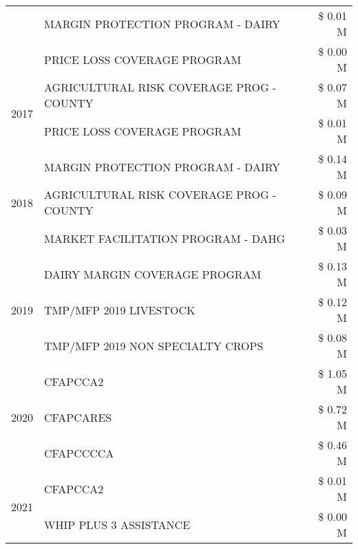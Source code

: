 \begin{tabular}{llr}
 & MARGIN PROTECTION PROGRAM - DAIRY & \$ 0.01 M \\
 & PRICE LOSS COVERAGE PROGRAM & \$ 0.00 M \\
\cline{1-3}
\multirow[t]{2}{*}{2017} & AGRICULTURAL RISK COVERAGE PROG - COUNTY & \$ 0.07 M \\
 & PRICE LOSS COVERAGE PROGRAM & \$ 0.01 M \\
\cline{1-3}
\multirow[t]{3}{*}{2018} & MARGIN PROTECTION PROGRAM - DAIRY & \$ 0.14 M \\
 & AGRICULTURAL RISK COVERAGE PROG - COUNTY & \$ 0.09 M \\
 & MARKET FACILITATION PROGRAM - DAHG & \$ 0.03 M \\
\cline{1-3}
\multirow[t]{3}{*}{2019} & DAIRY MARGIN COVERAGE PROGRAM & \$ 0.13 M \\
 & TMP/MFP 2019 LIVESTOCK & \$ 0.12 M \\
 & TMP/MFP 2019 NON SPECIALTY CROPS & \$ 0.08 M \\
\cline{1-3}
\multirow[t]{3}{*}{2020} & CFAPCCA2 & \$ 1.05 M \\
 & CFAPCARES & \$ 0.72 M \\
 & CFAPCCCCA & \$ 0.46 M \\
\cline{1-3}
\multirow[t]{2}{*}{2021} & CFAPCCA2 & \$ 0.01 M \\
 & WHIP PLUS 3 ASSISTANCE & \$ 0.00 M \\
\cline{1-3}
\bottomrule
\end{tabular}
